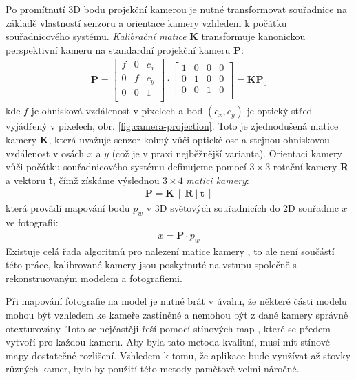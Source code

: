 \documentclass[11pt,twoside,a4paper]{book}
\begin{document}
Po promítnutí 3D bodu projekční kamerou je nutné transformovat souřadnice na základě vlastností senzoru a orientace kamery vzhledem k počátku souřadnicového systému.  \emph{Kalibrační matice} \textbf{K} transformuje kanonickou perspektivní kameru na standardní projekční kameru \textbf{P}: 
\begin{align}
\label{eq:calibration-matrix}
\textbf{P} = 
\begin{bmatrix}
f & 0 & c_x  \\
0 & f & c_y  \\
0 & 0 & 1  \\
\end{bmatrix}
\cdot
\begin{bmatrix}
1 & 0 & 0 & 0 \\
0 & 1 & 0 & 0 \\
0 & 0 & 1 & 0 \\
\end{bmatrix}
 =\textbf{K}\textbf{P}_0
\end{align}
\noindent
kde $f$ je ohnisková vzdálenost v pixelech a bod $(c_x, c_y)$ je optický střed vyjádřený v pixelech, obr. \ref{fig:camera-projection}. Toto je zjednodušená matice kamery \textbf{K}, která uvažuje senzor kolmý vůči optické ose a stejnou ohniskovou vzdálenost v osách $x$ a $y$ (což je v praxi nejběžnější varianta). Orientaci kamery vůči počátku souřadnicového systému definujeme pomocí $3\times3$ rotační kamery \textbf{R} a vektoru \textbf{t}, čímž získáme výslednou $3\times4$ \emph{matici kamery}:
\begin{align} 
\label{eq:calibration-matrix}
\textbf{P} = \textbf{K}~[~\textbf{R}~|~\textbf{t}~]
\end{align}
\noindent
která provádí mapování bodu $p_w$ v 3D světových souřadnicích do 2D souřadnic $x$ ve fotografii:
\begin{align}
x = \textbf{P}\cdotp p_w
\end{align}
Existuje celá řada algoritmů pro nalezení matice kamery \cite{Hartley2004}, to ale není součástí této práce, kalibrované kamery jsou poskytnuté na vstupu společně s rekonstruovaným modelem a fotografiemi.

Při mapování fotografie na model je nutné brát v úvahu, že některé části modelu mohou být vzhledem ke kameře zastíněné a nemohou být z dané kamery správně otexturovány. Toto se nejčastěji řeší pomocí stínových map \cite{Stamminger2002}, které se předem vytvoří pro každou kameru. Aby byla tato metoda kvalitní, musí mít stínové mapy dostatečné rozlišení.  Vzhledem k tomu, že aplikace bude využívat až stovky různých kamer, bylo by použití této metody paměťově velmi náročné.
\end{document}
